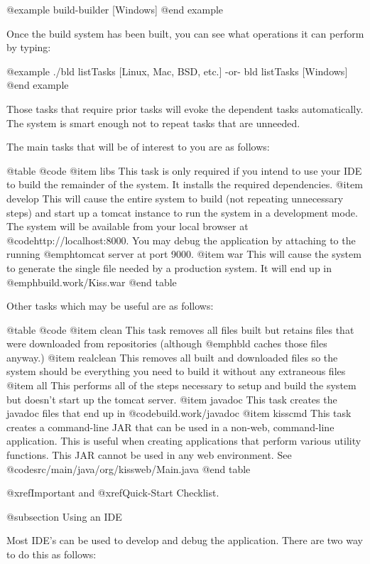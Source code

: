 @example
    build-builder             [Windows]
@end example

Once the build system has been built, you can see what operations it
can perform by typing:

@example
    ./bld listTasks           [Linux, Mac, BSD, etc.]
        -or-
    bld listTasks             [Windows]
@end example

Those tasks that require prior tasks will evoke the dependent tasks
automatically.  The system is smart enough not to repeat tasks that
are unneeded.

The main tasks that will be of interest to you are as follows:

@table @code
@item libs
This task is only required if you intend to use your IDE to build the
remainder of the system.  It installs the required dependencies.
@item develop
This will cause the entire system to build (not repeating unnecessary
steps) and start up a tomcat instance to run the system in a
development mode.  The system will be available from your local
browser at @code{http://localhost:8000}.  You may debug the
application by attaching to the running @emph{tomcat} server at port
9000.
@item war
This will cause the system to generate the single file needed by a
production system.  It will end up in @emph{build.work/Kiss.war}
@end table

Other tasks which may be useful are as follows:

@table @code
@item clean
This task removes all files built but retains files that were downloaded from
repositories (although @emph{bld} caches those files anyway.)
@item realclean
This removes all built and downloaded files so the system should be everything
you need to build it without any extraneous files
@item all
This performs all of the steps necessary to setup and build the system but
doesn't start up the tomcat server.
@item javadoc
This task creates the javadoc files that end up in @code{build.work/javadoc}
@item kisscmd
This task creates a command-line JAR that can be used in a non-web, command-line application.
This is useful when creating applications that perform various utility functions.  This
JAR cannot be used in any web environment.  See @code{src/main/java/org/kissweb/Main.java}
@end table

@xref{Important} and @xref{Quick-Start Checklist}.

@subsection Using an IDE

Most IDE's can be used to develop and debug the application.  There are two
way to do this as follows:

